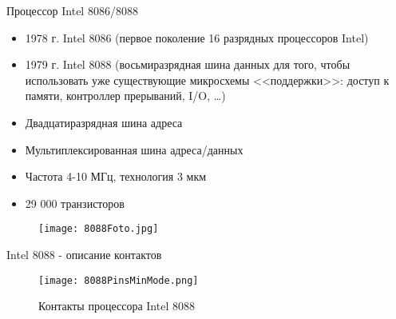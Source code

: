 \documentclass[aspectratio=169,14pt]{beamer}
\begin{document}
\begin{frame}{Процессор Intel 8086/8088}
    \begin{spacing}{0.8}
    \begin{itemize}
        \item 1978 г. Intel 8086 (первое поколение 16 разрядных процессоров Intel)
        \item 1979 г. Intel 8088 (восьмиразрядная шина данных для того, чтобы
        использовать уже существующие микросхемы <<поддержки>>: доступ к памяти,
        контроллер прерываний, I/O, \ldots)
        \item Двадцатиразрядная шина адреса
        \item Мультиплексированная шина адреса/данных
        \item Частота 4-10 МГц, технология 3 мкм
        \item 29 000 транзисторов
    \end{itemize}
    \begin{figure}[htp]
        \centering
        \texttt{[image: 8088Foto.jpg]}
    \end{figure}
    \end{spacing}
\end{frame}



\begin{frame}{Intel 8088 - описание контактов}
    \begin{figure}[htp]
        \centering
        \texttt{[image: 8088PinsMinMode.png]}
        \captionsetup{skip=-5pt}
        \caption{\tiny{Контакты процессора Intel 8088}}
    \end{figure}
\end{frame}
\end{document}
